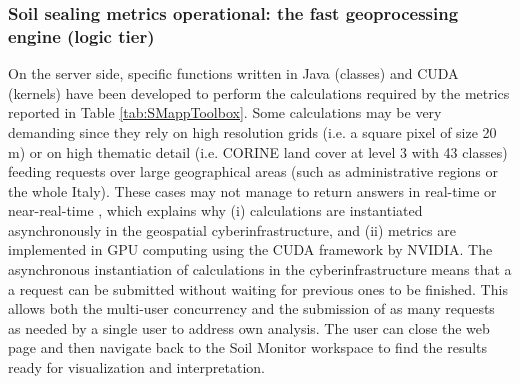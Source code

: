 \documentclass[APA,LATO1COL,doublespace]{WileyNJD-v2}
\newcommand{\update}[1]{\emph{\textcolor{blue}{#1}}}     %
\begin{document}
\subsubsection{ Soil sealing metrics operational: the fast geoprocessing engine (logic tier) } %
\label{sec:logicTier}
On the server side, specific functions written in Java (classes) and CUDA (kernels) have been developed to perform the calculations required by the metrics reported in Table \ref{tab:SMappToolbox}. 
Some calculations may be very demanding since they rely on high resolution grids (i.e. a square pixel of size 20 m) or on high thematic detail (i.e. CORINE land cover at level 3 with 43 classes) feeding requests over large geographical areas (such as administrative regions or the whole Italy).
These cases may not manage to return answers in real-time or near-real-time
, which explains why 
(i) calculations are instantiated asynchronously in the geospatial cyberinfrastructure, and
(ii) metrics are implemented in GPU computing using the CUDA framework by NVIDIA.
The asynchronous instantiation of calculations in the cyberinfrastructure means that a a request can be submitted without waiting for previous ones to be finished.
This allows both the multi-user concurrency and the submission of as many requests as needed by a single user to address own analysis.
The user can close the web page and then navigate back to the Soil Monitor workspace to find the results ready for visualization and interpretation.
\end{document}
